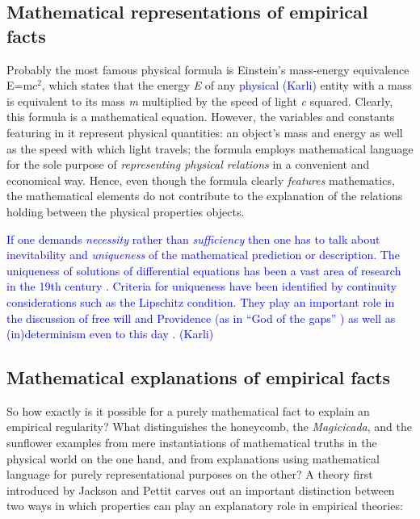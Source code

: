 \documentclass[a4paper,12pt]{article}
\newcommand{\karli}[1]{\textcolor{blue}{#1 (Karli)}}
\begin{document}
\subsection{Mathematical representations of empirical facts}

Probably the most famous physical formula is Einstein's mass-energy equivalence E=m$c^2$, which states that the energy \textit{E}
of any \karli{physical} entity with a mass is equivalent to its mass \textit{m} multiplied by the speed of light \textit{c} squared. Clearly, this formula is a mathematical equation. However, the variables and constants featuring in it represent physical quantities: an object's mass and energy as well as the speed with which light travels; the formula employs mathematical language for the sole purpose of \textit{representing physical relations} in a convenient and economical way. Hence, even though the formula clearly \textit{features} mathematics, the mathematical elements do not contribute to the explanation of the relations holding between the physical properties objects.

\karli{
If one demands {\em necessity} rather than {\em sufficiency} then one has to
talk about inevitability and {\em uniqueness} of the mathematical prediction or description.
The uniqueness of solutions of differential equations has been a vast area of research in the 19th century
\cite[Chapter~17]{svozil-2016-pu-book}.
Criteria for uniqueness have been identified by continuity considerations such as
the Lipschitz condition. They play an important role in the discussion of free will and Providence
(as in ``God of the gaps'' \cite{frank,franke}) as well as (in)determinism even to this day
\cite{Norton-2003-cafs,Norton-dome-2008}.
}

\subsection{Mathematical explanations of empirical facts}

So how exactly is it possible for a purely mathematical fact to explain an empirical regularity? What distinguishes the honeycomb, the \textit{Magicicada}, and the sunflower examples from mere instantiations of mathematical truths in the physical world on the one hand, and from explanations using mathematical language for purely representational purposes on the other? A theory first introduced by Jackson and Pettit carves out an important distinction between two ways in which properties can play an explanatory role in empirical theories:
\end{document}
